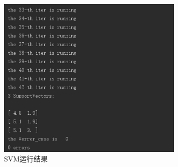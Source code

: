 \documentclass{ctexart}
\begin{document}
\begin{figure}[H]
\begin{center}
\includegraphics[width=0.8\textwidth]{fig/linear_out.png} %
\caption{SVM运行结果}
\end{center}
\end{figure}
\end{document}
